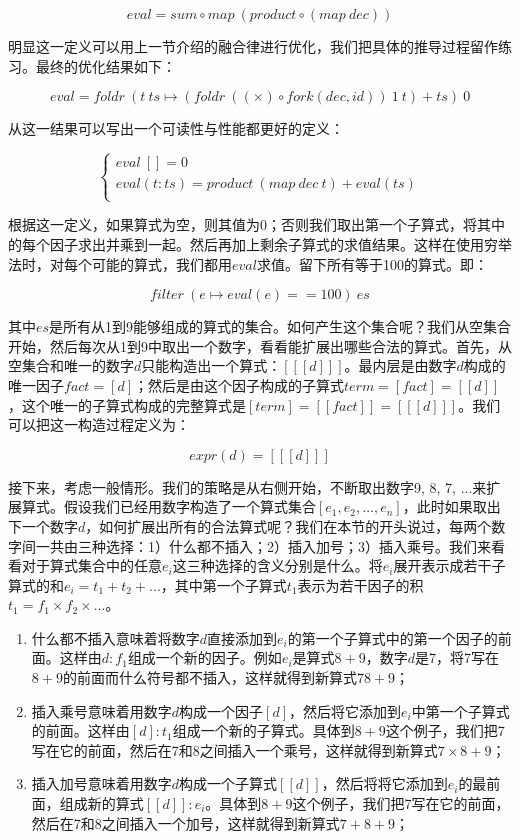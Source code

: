 \documentclass{article}
\begin{document}
\[
eval = sum \circ map\ (product \circ (map\ dec))
\]

明显这一定义可以用上一节介绍的融合律进行优化，我们把具体的推导过程留作练习。最终的优化结果如下：

\[
eval = foldr\ (t\ ts \mapsto (foldr\ ((\times) \circ fork(dec, id))\ 1\ t) + ts)\ 0
\]

从这一结果可以写出一个可读性与性能都更好的定义：

\[
\begin{cases}
eval\ [] = 0 \\
eval (t:ts) = product\ (map\ dec\ t) + eval(ts) \\
\end{cases}
\]

根据这一定义，如果算式为空，则其值为0；否则我们取出第一个子算式，将其中的每个因子求出并乘到一起。然后再加上剩余子算式的求值结果。这样在使用穷举法时，对每个可能的算式，我们都用$eval$求值。留下所有等于100的算式。即：

\[
filter\ (e \mapsto eval(e) == 100)\ es
\]

其中$es$是所有从1到9能够组成的算式的集合。如何产生这个集合呢？我们从空集合开始，然后每次从1到9中取出一个数字，看看能扩展出哪些合法的算式。首先，从空集合和唯一的数字$d$只能构造出一个算式：$[[[d]]]$。最内层是由数字$d$构成的唯一因子$fact = [d]$；然后是由这个因子构成的子算式$term = [fact] = [[d]]$，这个唯一的子算式构成的完整算式是$[term] = [[fact]] = [[[d]]]$。我们可以把这一构造过程定义为：

\[
expr(d) = [[[d]]]
\]

接下来，考虑一般情形。我们的策略是从右侧开始，不断取出数字9, 8, 7, ...来扩展算式。假设我们已经用数字构造了一个算式集合$[e_1, e_2, ..., e_n]$，此时如果取出下一个数字$d$，如何扩展出所有的合法算式呢？我们在本节的开头说过，每两个数字间一共由三种选择：1）什么都不插入；2）插入加号；3）插入乘号。我们来看看对于算式集合中的任意$e_i$这三种选择的含义分别是什么。将$e_i$展开表示成若干子算式的和$e_i = t_1 + t_2 + ...$，其中第一个子算式$t_1$表示为若干因子的积$t_1 = f_1 \times f_2 \times ...$。

\begin{enumerate}
\item 什么都不插入意味着将数字$d$直接添加到$e_i$的第一个子算式中的第一个因子的前面。这样由$d:f_1$组成一个新的因子。例如$e_i$是算式$8 + 9$，数字$d$是7，将7写在$8+9$的前面而什么符号都不插入，这样就得到新算式$78 + 9$；
\item 插入乘号意味着用数字$d$构成一个因子$[d]$，然后将它添加到$e_i$中第一个子算式的前面。这样由$[d]:t_1$组成一个新的子算式。具体到$8 + 9$这个例子，我们把7写在它的前面，然后在7和8之间插入一个乘号，这样就得到新算式$7 \times 8 + 9$；
\item 插入加号意味着用数字$d$构成一个子算式$[[d]]$，然后将将它添加到$e_i$的最前面，组成新的算式$[[d]]:e_i$。具体到$8 + 9$这个例子，我们把7写在它的前面，然后在7和8之间插入一个加号，这样就得到新算式$7 + 8 + 9$；
\end{enumerate}
\end{document}

